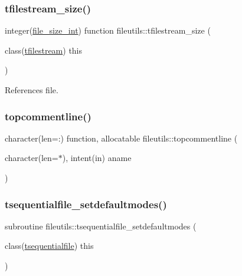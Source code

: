 \mbox{\label{namespacefileutils_ab4722eb4f85ef9a9326342dfcad3f0cc}} 
\subsubsection{\texorpdfstring{tfilestream\+\_\+size()}{tfilestream\_size()}}
{\footnotesize\ttfamily integer(\mbox{\hyperlink{namespacefileutils_a334ae57c14956bd4597df7a130f6e8a8}{file\+\_\+size\+\_\+int}}) function fileutils\+::tfilestream\+\_\+size (\begin{DoxyParamCaption}\item[{class(\mbox{\hyperlink{structfileutils_1_1tfilestream}{tfilestream}})}]{this }\end{DoxyParamCaption})\hspace{0.3cm}{\ttfamily [private]}}



References file.

\mbox{\label{namespacefileutils_ae11b16645a03a608941045fd5b9d2d8a}} 
\subsubsection{\texorpdfstring{topcommentline()}{topcommentline()}}
{\footnotesize\ttfamily character(len=\+:) function, allocatable fileutils\+::topcommentline (\begin{DoxyParamCaption}\item[{character(len=$\ast$), intent(in)}]{aname }\end{DoxyParamCaption})\hspace{0.3cm}{\ttfamily [private]}}

\mbox{\label{namespacefileutils_aae5dfea33ac7521267fc2bd055c532e7}} 
\subsubsection{\texorpdfstring{tsequentialfile\+\_\+setdefaultmodes()}{tsequentialfile\_setdefaultmodes()}}
{\footnotesize\ttfamily subroutine fileutils\+::tsequentialfile\+\_\+setdefaultmodes (\begin{DoxyParamCaption}\item[{class(\mbox{\hyperlink{structfileutils_1_1tsequentialfile}{tsequentialfile}})}]{this }\end{DoxyParamCaption})\hspace{0.3cm}{\ttfamily [private]}}

